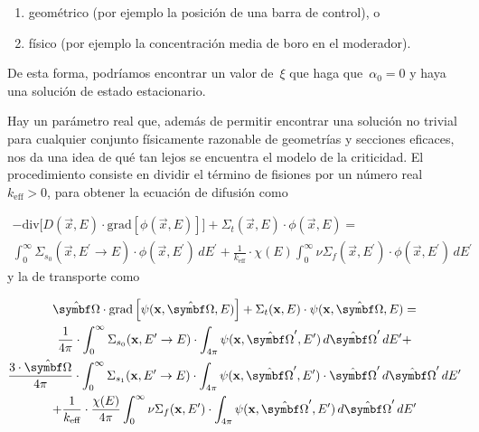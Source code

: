 \documentclass[
  12pt,
  a4paper,
  table]{scrbook}
\providecommand{\tightlist}{%
  \setlength{\itemsep}{0pt}\setlength{\parskip}{0pt}}\usepackage{longtable,booktabs,array}
\theoremstyle{plain}
\theoremstyle{definition}
\theoremstyle{plain}
\theoremstyle{plain}
\theoremstyle{remark}
\begin{document}
\begin{enumerate}
\def\labelenumi{\alph{enumi}.}
\tightlist
\item
  geométrico (por ejemplo la posición de una barra de control), o
\item
  físico (por ejemplo la concentración media de boro en el moderador).
\end{enumerate}

De esta forma, podríamos encontrar un valor de~\(\xi\) que haga
que~\(\alpha_0 = 0\) y haya una solución de estado estacionario.

Hay un parámetro real que, además de permitir encontrar una solución no
trivial para cualquier conjunto físicamente razonable de geometrías y
secciones eficaces, nos da una idea de qué tan lejos se encuentra el
modelo de la criticidad. El procedimiento consiste en dividir el término
de fisiones por un número real~\(k_\text{eff} > 0\), para obtener la
ecuación de difusión como

\[\begin{gathered}
 - \text{div} \Big[ D(\vec{x}, E) \cdot \text{grad} \left[ \phi(\vec{x}, E) \right] \Big]
 + \Sigma_t(\vec{x}, E) \cdot \phi(\vec{x}, E)
 = \\
\int_{0}^{\infty} \Sigma_{s_0}(\vec{x}, E^{\prime} \rightarrow E)  \cdot \phi(\vec{x}, E^\prime) \, dE^\prime +
\frac{1}{k_\text{eff}} \cdot \chi(E) \int_{0}^{\infty} \nu\Sigma_f(\vec{x}, E^\prime) \cdot \phi(\vec{x}, E^\prime) \, dE^\prime
\end{gathered}
\] y la de transporte como

\[
\begin{gathered}
 \omegaversor \cdot \text{grad} \left[ \psi(\vec{x}, \omegaversor, E) \right]
 + \Sigma_t(\vec{x}, E) \cdot \psi(\vec{x}, \omegaversor, E) = \\
\frac{1}{4\pi} \cdot 
\int_{0}^{\infty} \Sigma_{s_0}(\vec{x}, E^{\prime} \rightarrow E) \cdot \int_{4\pi} \psi(\vec{x}, \omegaprimaversor, E^{\prime}) \, d\omegaprimaversor \, dE^\prime + \\
\frac{3 \cdot \omegaversor}{4\pi} \cdot
\int_{0}^{\infty} \Sigma_{s_1}(\vec{x}, E^{\prime} \rightarrow E) \cdot \int_{4\pi} \psi(\vec{x}, \omegaprimaversor, E^{\prime}) \cdot \omegaprimaversor \, d\omegaprimaversor \, dE^\prime  \\
+ \frac{1}{k_\text{eff}} \cdot \frac{\chi(E)}{4\pi} \int_{0}^{\infty} \nu\Sigma_f(\vec{x}, E^\prime) \cdot \int_{4\pi} \psi(\vec{x}, \omegaprimaversor, E^{\prime}) \, d\omegaprimaversor \, dE^\prime
\end{gathered}
\]
\end{document}
